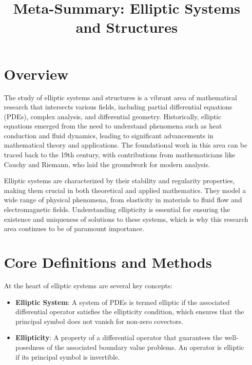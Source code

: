 \documentclass[11pt,a4paper]{article}
\title{Meta-Summary: Elliptic Systems and Structures}
\date{}
\begin{document}
\maketitle

\section{Overview}

The study of elliptic systems and structures is a vibrant area of mathematical research that intersects various fields, including partial differential equations (PDEs), complex analysis, and differential geometry. Historically, elliptic equations emerged from the need to understand phenomena such as heat conduction and fluid dynamics, leading to significant advancements in mathematical theory and applications. The foundational work in this area can be traced back to the 19th century, with contributions from mathematicians like Cauchy and Riemann, who laid the groundwork for modern analysis.

Elliptic systems are characterized by their stability and regularity properties, making them crucial in both theoretical and applied mathematics. They model a wide range of physical phenomena, from elasticity in materials to fluid flow and electromagnetic fields. Understanding ellipticity is essential for ensuring the existence and uniqueness of solutions to these systems, which is why this research area continues to be of paramount importance.

\section{Core Definitions and Methods}

At the heart of elliptic systems are several key concepts:

\begin{itemize}
\item \textbf{Elliptic System}: A system of PDEs is termed elliptic if the associated differential operator satisfies the ellipticity condition, which ensures that the principal symbol does not vanish for non-zero covectors.
\end{itemize}

\begin{itemize}
\item \textbf{Ellipticity}: A property of a differential operator that guarantees the well-posedness of the associated boundary value problems. An operator is elliptic if its principal symbol is invertible.
\end{itemize}
\end{document}
